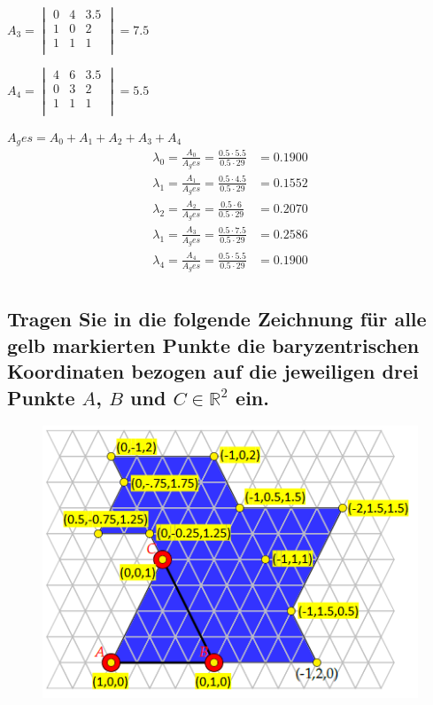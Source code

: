 \documentclass[a4paper,10pt,DIV=14]{scrartcl}
\begin{document}
$A_3 = \begin{vmatrix}
			0 & 4 &  3.5 \\
			1 & 0 &  2   \\
			1 & 1 &  1   \\
		\end{vmatrix} = 7.5 $

$A_4 = \begin{vmatrix}
			4 & 6 &  3.5 \\
			0 & 3 &  2   \\
			1 & 1 &  1   \\
		\end{vmatrix} = 5.5 $

$A_ges = A_0 + A_1 + A_2 + A_3 + A_4$
\begin{align*}
\lambda_0 = \frac{A_0}{A_ges} = \frac{0.5 \cdot 5.5}{0.5 \cdot 29} & = 0.1900 \\
\lambda_1 = \frac{A_1}{A_ges} =\frac{0.5 \cdot 4.5}{0.5 \cdot 29} & = 0.1552 \\
\lambda_2 = \frac{A_2}{A_ges} =\frac{0.5 \cdot 6}{0.5 \cdot 29}   & = 0.2070 \\
\lambda_1 = \frac{A_3}{A_ges} =\frac{0.5 \cdot 7.5}{0.5 \cdot 29} & = 0.2586 \\
\lambda_4 = \frac{A_4}{A_ges} =\frac{0.5 \cdot 5.5}{0.5 \cdot 29} & = 0.1900 \\
\end{align*}


\subsection{Tragen Sie in die folgende Zeichnung für alle gelb markierten Punkte die baryzentrischen Koordinaten bezogen auf die jeweiligen drei Punkte $A$, $B$ und $C \in \mathbb{R}^2$ ein.}

\begin{figure}[!htbp]
	\centering						
	\includegraphics[width=0.95\linewidth]{map2}
\end{figure}
\end{document}
